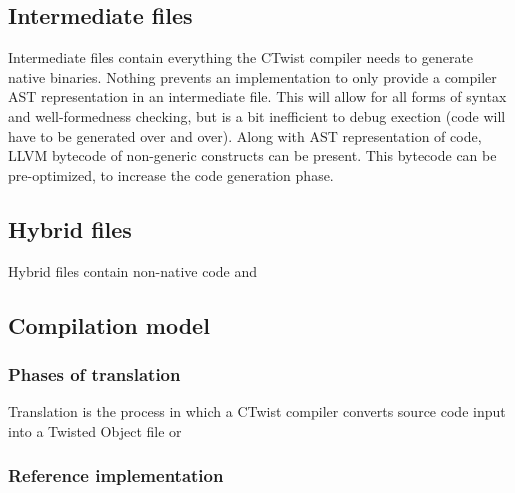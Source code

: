 \documentclass[a4paper,11pt]{article}
\begin{document}
  \subsection{Intermediate files}

Intermediate files contain everything the CTwist compiler needs to generate native binaries.
Nothing prevents an implementation to only provide a compiler AST representation in an intermediate file.
This will allow for all forms of syntax and well-formedness checking, but is a bit inefficient to debug exection (code will have to be generated over and over).
Along with AST representation of code, LLVM bytecode of non-generic constructs can be present.
This bytecode can be pre-optimized, to increase the code generation phase. 

  \subsection{Hybrid files}

Hybrid files contain non-native code and 

  \subsection{Compilation model}
    \subsubsection{Phases of translation}

Translation is the process in which a CTwist compiler converts source code input into a Twisted Object file or 

    \subsubsection{Reference implementation}
\end{document}
